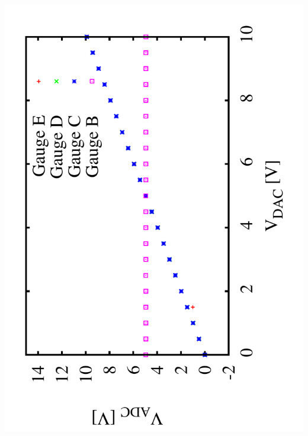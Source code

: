 \documentclass[a4paper,11pt]{book}
\begin{document}
 \hspace*{2cm}\includegraphics[angle=-90,scale=0.15]{image_ai_01.pdf}
\end{document}
